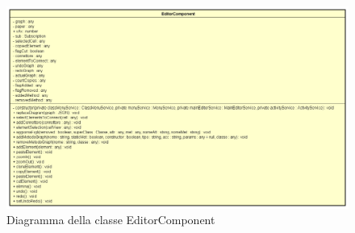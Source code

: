 \begin{figure}[h!]
	\centering
	\includegraphics[scale=0.5]{res/sections/SpecificaFrontEnd/Components/Disegnetti/editor.png}
	\caption{Diagramma della classe EditorComponent}
\end{figure}

